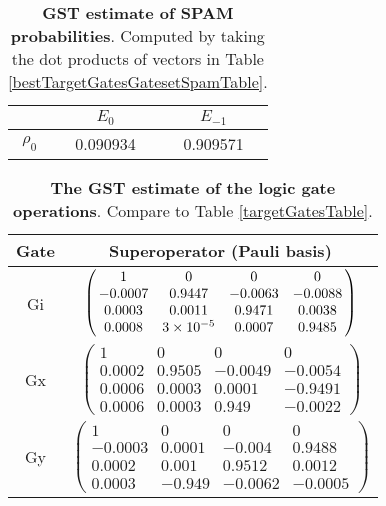 {\begin{table}[h]
\begin{center}
\begin{tabular}[l]{|c|c|c|}
\hline
 & $E_{0}$ & $E_{-1}$ \\ \hline
$\rho_{0}$ & 0.090934 & 0.909571 \\ \hline
\end{tabular}

\caption{\textbf{GST estimate of SPAM probabilities}.  Computed by taking the dot products of vectors in Table \ref{bestTargetGatesGatesetSpamTable}.\label{bestTargetGatesGatesetSpamParametersTable}}
\end{center}
\end{table}

\begin{table}[h]
\begin{center}
\begin{tabular}[l]{|c|c|}
\hline
Gate & Superoperator (Pauli basis) \\ \hline
Gi & $ \left(\!\!\begin{array}{cccc}
1 & 0 & 0 & 0 \\ 
-0.0007 & 0.9447 & -0.0063 & -0.0088 \\ 
0.0003 & 0.0011 & 0.9471 & 0.0038 \\ 
0.0008 & 3\times 10^{-5} & 0.0007 & 0.9485
 \end{array}\!\!\right) $
 \\ \hline
Gx & $ \left(\!\!\begin{array}{cccc}
1 & 0 & 0 & 0 \\ 
0.0002 & 0.9505 & -0.0049 & -0.0054 \\ 
0.0006 & 0.0003 & 0.0001 & -0.9491 \\ 
0.0006 & 0.0003 & 0.949 & -0.0022
 \end{array}\!\!\right) $
 \\ \hline
Gy & $ \left(\!\!\begin{array}{cccc}
1 & 0 & 0 & 0 \\ 
-0.0003 & 0.0001 & -0.004 & 0.9488 \\ 
0.0002 & 0.001 & 0.9512 & 0.0012 \\ 
0.0003 & -0.949 & -0.0062 & -0.0005
 \end{array}\!\!\right) $
 \\ \hline
\end{tabular}

\caption{\textbf{The GST estimate of the logic gate operations}.  Compare to Table \ref{targetGatesTable}.\label{bestTargetGatesGatesetGatesTable}}
\end{center}
\end{table}

}
